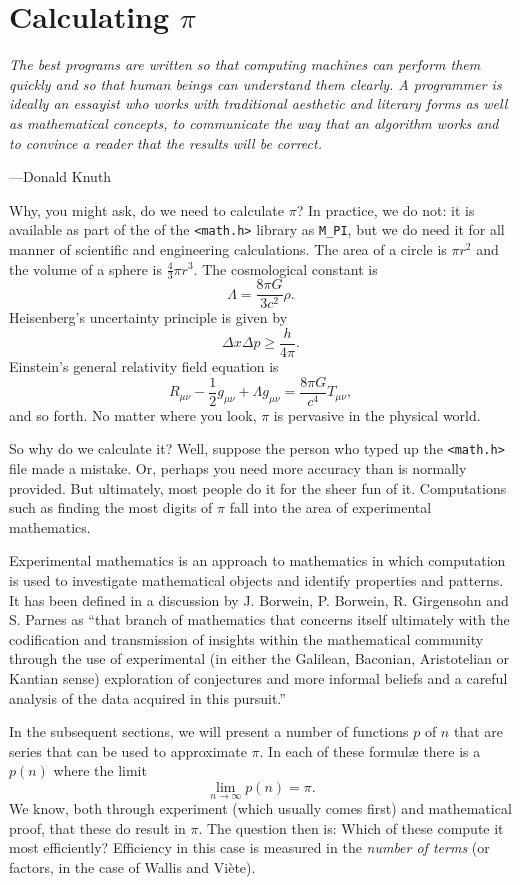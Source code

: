 \section{Calculating $\pi$}

\epigraph{\emph{The best programs are written so that computing machines
    can perform them quickly and so that human beings can understand
    them clearly. A programmer is ideally an essayist who works with
    traditional aesthetic and literary forms as well as mathematical
concepts, to communicate the way that an algorithm works and to convince
a reader that the results will be correct.}}{---Donald Knuth}\noindent

Why, you might ask, do we need to calculate $\pi$? In practice, we do
not: it is available as part of the of the \texttt{<math.h>} library as
\texttt{M\_PI}, but we do need it for all manner of scientific and
engineering calculations.  The area of a circle is $\pi r^2$ and the
volume of a sphere is $\frac{4}{3} \pi r^3.$  The cosmological constant
is $$\Lambda = \frac{8 \pi G}{3 c^2} \rho.$$  Heisenberg's uncertainty
principle is given by $$\Delta x \Delta p \ge \frac{h}{4 \pi}.$$
Einstein's general relativity field equation is $$R_{\mu\nu} -
\frac{1}{2}g_{\mu\nu} +\Lambda g_{\mu\nu} = \frac{8 \pi G}{c^4}
T_{\mu\nu},$$ and so forth. No matter where you look, $\pi$ is pervasive
in the physical world.

So why do we calculate it? Well, suppose the person who typed up the
\texttt{<math.h>} file made a mistake.  Or, perhaps you need more
accuracy than is normally provided. But ultimately, most people do it
for the sheer fun of it. Computations such as finding the most digits of
$\pi$ fall into the area of experimental mathematics.

Experimental mathematics is an approach to mathematics in which
computation is used to investigate mathematical objects and identify
properties and patterns. It has been defined in a discussion by
J.\xspace Borwein, P.\xspace Borwein, R.\xspace Girgensohn and S.\xspace
Parnes as ``that branch of mathematics that concerns itself ultimately
with the codification and transmission of insights within the
mathematical community through the use of experimental (in either the
Galilean, Baconian, Aristotelian or Kantian sense) exploration of
conjectures and more informal beliefs and a careful analysis of the data
acquired in this pursuit.''

In the subsequent sections, we will present a number of functions $p$
of $n$ that are series that can be used to approximate $\pi$. In each of
these formul\ae\xspace there is a $p(n)$ where the limit
$$\lim_{n\rightarrow\infty} p(n) = \pi.$$ We know, both through
experiment (which usually comes first) and mathematical proof, that
these do result in $\pi$. The question then is: Which of these compute
it most efficiently? Efficiency in this case is measured in the
\emph{number of terms} (or factors, in the case of Wallis and Vi\`{e}te).

